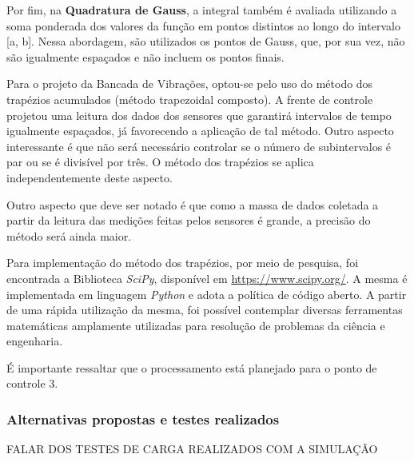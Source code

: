 Por fim, na \textbf{Quadratura de Gauss}, a integral também é avaliada utilizando a soma ponderada dos valores da função em pontos distintos 
ao longo do intervalo [a, b]. Nessa abordagem, são utilizados os pontos de Gauss, que, por sua vez, não são igualmente espaçados e não incluem 
os pontos finais.

Para o projeto da Bancada de Vibrações, optou-se pelo uso do método dos trapézios acumulados (método trapezoidal composto). A frente de 
controle projetou uma leitura dos dados dos sensores que garantirá intervalos de tempo igualmente espaçados, já favorecendo a aplicação de 
tal método. Outro aspecto interessante é que não será necessário controlar se o número de subintervalos é par ou se é divisível por três. 
O método dos trapézios se aplica independentemente deste aspecto.

Outro aspecto que deve ser notado é que como a massa de dados coletada a partir da leitura das medições feitas pelos sensores é grande, a
precisão do método será ainda maior.

Para implementação do método dos trapézios, por meio de pesquisa, foi encontrada a Biblioteca \textit{SciPy}, disponível em \href{https://www.scipy.org/}{https://www.scipy.org/}. A mesma é implementada em linguagem \textit{Python} e adota a política de código aberto. A partir de uma rápida utilização da mesma, foi possível contemplar diversas ferramentas matemáticas amplamente utilizadas para resolução de problemas da ciência e engenharia.

É importante ressaltar que o processamento está planejado para o ponto de controle 3.

\subsubsection{\textbf{Alternativas propostas e testes realizados}}


FALAR DOS TESTES DE CARGA REALIZADOS COM A SIMULAÇÃO
